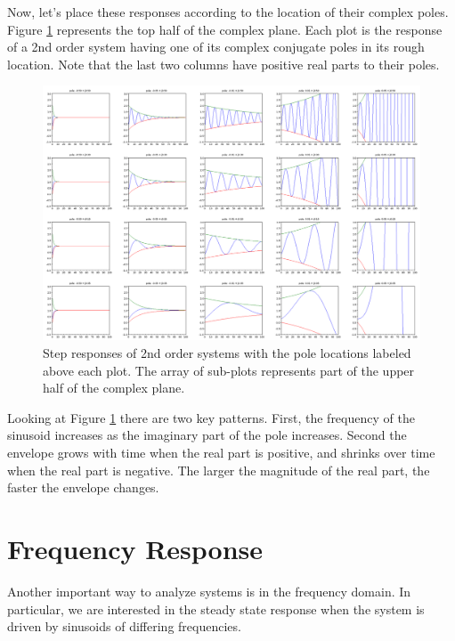 Now, let's place these responses according to the location of their complex poles.  Figure \ref{splaneresponse} represents the top half of the complex plane.   Each plot is the response of a 2nd order system having one of its complex conjugate poles in its rough location.  Note that the last two columns have positive real parts to their poles.



\begin{figure}\centering
\includegraphics[width=6.5in]{figs05/s_plane_responsesa.png}
\caption{Step responses of 2nd order systems with the pole locations labeled above each plot. The array of sub-plots represents part of the upper half of the complex plane.}\label{splaneresponse}
\end{figure}


Looking at Figure \ref{splaneresponse} there are two key patterns.  First, the frequency of the sinusoid increases as the imaginary part of the pole increases.  Second the envelope grows with time when the real part is positive, and shrinks over time when the real part is negative.   The larger the magnitude of the real part, the faster the envelope changes.





\section{Frequency Response}\label{FrequencyResponseSection}

Another important way to analyze systems is in the frequency domain.   In particular, we are interested in the steady state response when the system is driven by  sinusoids of differing frequencies.

